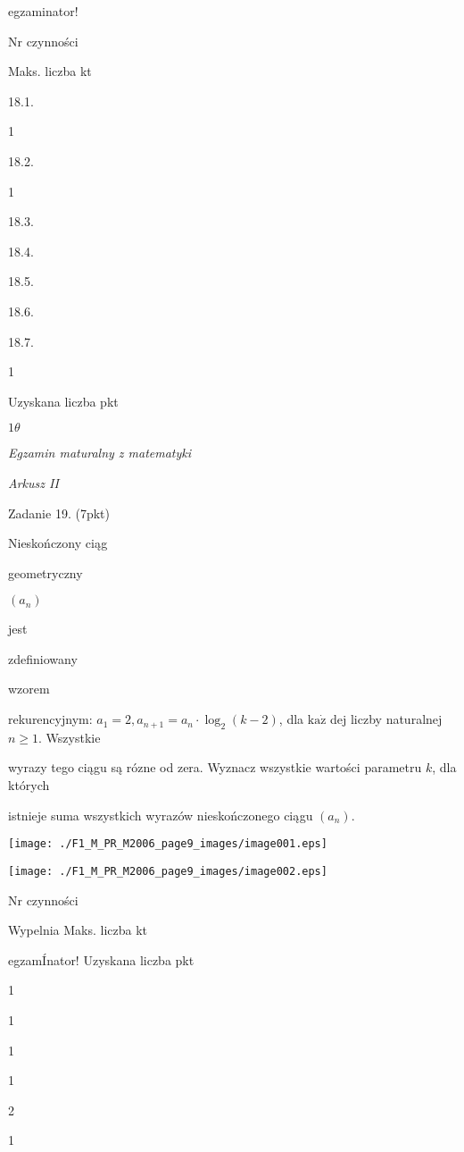 \documentclass[a4paper,12pt]{article}
\begin{document}
egzaminator!

Nr czynności

Maks. liczba kt

18.1.

1

18.2.

1

18.3.

18.4.

18.5.

18.6.

18.7.

1

Uzyskana liczba pkt





$ 1\theta$

{\it Egzamin maturalny z matematyki}

{\it Arkusz II}

Zadanie 19. (7pkt)

Nieskończony ciąg

geometryczny

$(a_{n})$

jest

zdefiniowany

wzorem

rekurencyjnym: $a_{1}=2, a_{n+1}=a_{n}\cdot\log_{2}(k-2)$, dla $\mathrm{k}\mathrm{a}\dot{\mathrm{z}}$ dej liczby naturalnej $n\geq 1$. Wszystkie

wyrazy tego ciągu są rózne od zera. Wyznacz wszystkie wartości parametru $k$, dla których

istnieje suma wszystkich wyrazów nieskończonego ciągu $(a_{n}).$
\begin{center}
\texttt{[image: ./F1\_M\_PR\_M2006\_page9\_images/image001.eps]}

\texttt{[image: ./F1\_M\_PR\_M2006\_page9\_images/image002.eps]}
\end{center}
Nr czynności

Wypelnia Maks. liczba kt

egzamÍnator! Uzyskana liczba pkt

1

1

1

1

2

1
\end{document}
